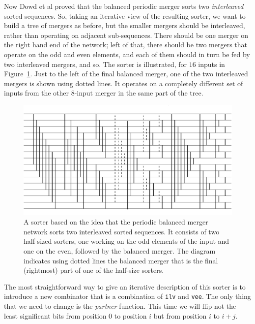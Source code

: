 Now Dowd et al proved that the balanced periodic merger sorts two {\em interleaved} sorted sequences. So, taking an iterative view of the resulting sorter,
we want to build a tree of mergers as before, but the smaller mergers should
be interleaved, rather than operating on adjacent sub-sequences.
There should be one merger on the right hand end of the network; left of
that, there should be two mergers that operate on the odd and even elements,
and each of them should in turn be fed by two interleaved mergers, and so.
The sorter is illustrated, for $16$ inputs in Figure~\ref{fig:vsorter}.
Just to the left of the final balanced merger, one of the two interleaved
mergers is shown using dotted lines. It operates on a completely different set of inputs from the other 8-input merger in the same part of the tree.

\begin{figure}
\centering
\includegraphics[scale=0.5]{./expressive/vsorter}
\caption{A sorter based on the idea that the periodic
balanced merger network sorts two interleaved sorted sequences.
It consists of two half-sized sorters, one working on the
odd elements of the input and one on the even, followed by
the balanced merger. The diagram indicates using dotted lines the
balanced merger that is the final (rightmost) part of
one of the half-size sorters.}
\label{fig:vsorter}
\end{figure}

The most straightforward way to give an iterative description of
this sorter is
to introduce a new combinator that is a combination of
{\tt ilv} and {\tt vee}.
The only thing that we need to change is the {\em partner} function.
This time we will flip not the least significant bits from position $0$ to
position $i$ but from position $i$ to $i+j$.

